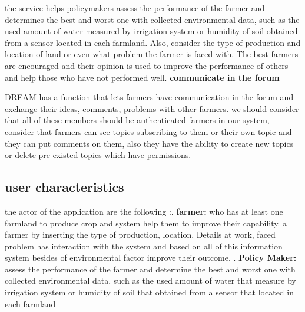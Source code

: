 the service helps policymakers assess the performance of the farmer and determines the best and worst one with collected environmental data, such as the used amount of water measured by irrigation system or humidity of soil obtained from a sensor located in each farmland. Also, consider the type of production and location of land or even what problem the farmer is faced with. The best farmers are encouraged and their opinion is used to improve the performance of others and help those who have not performed well. 
 \newline
 \newline
\textbf{communicate in the forum}

DREAM has a function that lets farmers have communication in the forum and exchange their ideas, comments, problems with other farmers. we should consider that all of these members should be authenticated farmers in our system, consider that farmers can see topics subscribing to them or their own topic and they can put comments on them, also they have the ability to create new topics or delete pre-existed topics which have permissions.






\pagebreak
\subsection{user characteristics}
the actor of the application  are the following :\newline{}. \textbf{farmer:} who has at least one farmland to produce crop and system help them to improve their capability. a farmer by inserting the type of production, location, Details at work, faced problem has interaction with the system and based on all of this information system besides of environmental factor improve their outcome.\newline
 . \textbf{Policy Maker:}  assess the performance of the farmer and determine the best and worst one with collected environmental data, such as the used amount of water that measure by irrigation system or humidity of soil that obtained from a sensor that located in each farmland  

















